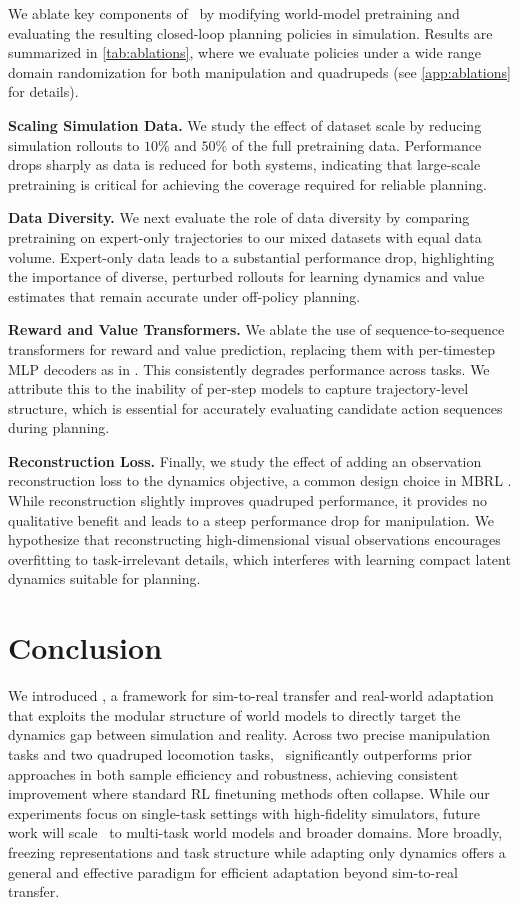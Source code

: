We ablate key components of \Method\ by modifying world-model pretraining and evaluating the resulting closed-loop planning policies in simulation. Results are summarized in \cref{tab:ablations}, where we evaluate policies under a wide range domain randomization for both manipulation and quadrupeds (see \cref{app:ablations} for details). 

\textbf{Scaling Simulation Data.}
We study the effect of dataset scale by reducing simulation rollouts to $10\%$ and $50\%$ of the full pretraining data. Performance drops sharply as data is reduced for both systems, indicating that large-scale pretraining is critical for achieving the coverage required for reliable planning.

\textbf{Data Diversity.}
We next evaluate the role of data diversity by comparing pretraining on expert-only trajectories to our mixed datasets with equal data volume. Expert-only data leads to a substantial performance drop, highlighting the importance of diverse, perturbed rollouts for learning dynamics and value estimates that remain accurate under off-policy planning.

\textbf{Reward and Value Transformers.}
We ablate the use of sequence-to-sequence transformers for reward and value prediction, replacing them with per-timestep MLP decoders as in \cite{hafnerdream, hansen2022temporal}. This consistently degrades performance across tasks. We attribute this to the inability of per-step models to capture trajectory-level structure, which is essential for accurately evaluating candidate action sequences during planning.

\textbf{Reconstruction Loss.}
Finally, we study the effect of adding an observation reconstruction loss to the dynamics objective, a common design choice in MBRL \cite{hafnerdream, bruce2024genie}. While reconstruction slightly improves quadruped performance, it provides no qualitative benefit and leads to a steep performance drop for manipulation. We hypothesize that reconstructing high-dimensional visual observations encourages overfitting to task-irrelevant details, which interferes with learning compact latent dynamics suitable for planning.

\section{Conclusion}
We introduced \Method, a framework for sim-to-real transfer and real-world adaptation that exploits the modular structure of world models to directly target the dynamics gap between simulation and reality. Across two precise manipulation tasks and two quadruped locomotion tasks, \Method\ significantly outperforms prior approaches in both sample efficiency and robustness, achieving consistent improvement where standard RL finetuning methods often collapse. While our experiments focus on single-task settings with high-fidelity simulators, future work will scale \Method\ to multi-task world models and broader domains. More broadly, freezing representations and task structure while adapting only dynamics offers a general and effective paradigm for efficient adaptation beyond sim-to-real transfer.



